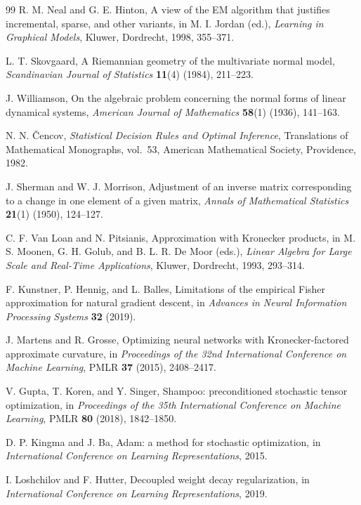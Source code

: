 \documentclass[11pt]{article}
\theoremstyle{definition}
\theoremstyle{remark}
\begin{document}
\begin{thebibliography}{99}
R. M. Neal and G. E. Hinton, A view of the EM algorithm that justifies incremental, sparse, and other variants, in M. I. Jordan (ed.), \emph{Learning in Graphical Models}, Kluwer, Dordrecht, 1998, 355--371.

L. T. Skovgaard, A Riemannian geometry of the multivariate normal model, \emph{Scandinavian Journal of Statistics} \textbf{11}(4) (1984), 211--223.

J. Williamson, On the algebraic problem concerning the normal forms of linear dynamical systems, \emph{American Journal of Mathematics} \textbf{58}(1) (1936), 141--163.

N. N. \v{C}encov, \emph{Statistical Decision Rules and Optimal Inference}, Translations of Mathematical Monographs, vol.~53, American Mathematical Society, Providence, 1982.

J. Sherman and W. J. Morrison, Adjustment of an inverse matrix corresponding to a change in one element of a given matrix, \emph{Annals of Mathematical Statistics} \textbf{21}(1) (1950), 124--127.

C. F. Van Loan and N. Pitsianis, Approximation with Kronecker products, in M. S. Moonen, G. H. Golub, and B. L. R. De Moor (eds.), \emph{Linear Algebra for Large Scale and Real-Time Applications}, Kluwer, Dordrecht, 1993, 293--314.

F. Kunstner, P. Hennig, and L. Balles, Limitations of the empirical Fisher approximation for natural gradient descent, in \emph{Advances in Neural Information Processing Systems} \textbf{32} (2019).

J. Martens and R. Grosse, Optimizing neural networks with Kronecker-factored approximate curvature, in \emph{Proceedings of the 32nd International Conference on Machine Learning}, PMLR \textbf{37} (2015), 2408--2417.

V. Gupta, T. Koren, and Y. Singer, Shampoo: preconditioned stochastic tensor optimization, in \emph{Proceedings of the 35th International Conference on Machine Learning}, PMLR \textbf{80} (2018), 1842--1850.

D. P. Kingma and J. Ba, Adam: a method for stochastic optimization, in \emph{International Conference on Learning Representations}, 2015.

I. Loshchilov and F. Hutter, Decoupled weight decay regularization, in \emph{International Conference on Learning Representations}, 2019.
\end{thebibliography}
\end{document}
